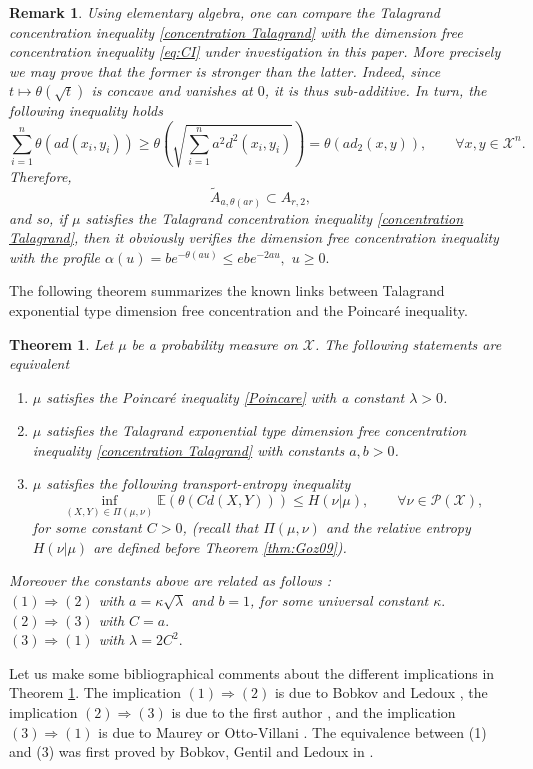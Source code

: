 \documentclass[11pt]{amsart}
\newtheorem{thm}[equation]{Theorem}
\newtheorem{rem}[equation]{Remark}
\numberwithin{equation}{section}
\begin{document}
\begin{rem} \label{froid}
Using elementary algebra, one can compare the Talagrand concentration inequality \eqref{concentration Talagrand}
with the dimension free concentration inequality \eqref{eq:CI} under investigation in this paper.
More precisely we may prove that the former is stronger than the latter.
Indeed, since $t\mapsto \theta(\sqrt{t})$ is concave and vanishes at $0$, it is thus sub-additive. In turn, the following inequality holds
\[
\sum_{i=1}^n\theta(ad(x_i,y_i)) \geq \theta\left(\sqrt{\sum_{i=1}^n a^2d^2(x_i,y_i)}\right)=\theta(ad_2(x,y)),\qquad \forall x,y\in {\mathcal{X}}^n.
\]
Therefore,
\[
\widetilde{A}_{a,\theta(ar)} \subset A_{r,2},
\]
and so, if $\mu$ satisfies the Talagrand concentration inequality \eqref{concentration Talagrand}, then it obviously verifies the dimension free concentration inequality with the profile $\alpha(u)=be^{-\theta(au)}\leq ebe^{-2au},$ $u\geq0.$
\end{rem}

The following theorem summarizes the known links between Talagrand exponential type dimension free concentration and the Poincar\'e inequality.
\begin{thm}\label{Gozlan 09} 
Let $\mu$ be a probability measure on ${\mathcal{X}}$. The following statements are equivalent 
\begin{enumerate}
\item $\mu$ satisfies the Poincar\'e inequality \eqref{Poincare} with a constant $\lambda>0$.
\item $\mu$ satisfies the Talagrand exponential type dimension free concentration inequality \eqref{concentration Talagrand} with constants $a,b>0$.

\item  $\mu$ satisfies the following transport-entropy inequality
\[
\inf_{(X,Y) \in \Pi(\mu,\nu)}\mathbb{E} \left( \theta(Cd(X,Y)) \right) \leq  H(\nu|\mu),\qquad \forall \nu \in \mathcal{P}({\mathcal{X}}),
\]
for some constant $C>0$, (recall that $\Pi(\mu,\nu)$ and the relative entropy $H(\nu|\mu)$ are defined before Theorem \ref{thm:Goz09}).
\end{enumerate}
Moreover the constants above are related as follows :\\
$(1)\Rightarrow (2)$ with $a=\kappa \sqrt{\lambda}$ and $b=1$, for some universal constant $\kappa.$\\
$(2)\Rightarrow (3)$ with $C=a.$\\
$(3)\Rightarrow (1)$ with $\lambda=2C^2.$
\end{thm}
Let us make some bibliographical comments about the different implications in Theorem \ref{Gozlan 09}. The implication $(1)\Rightarrow (2)$ is due to Bobkov and Ledoux \cite{BL97}, the implication $(2)\Rightarrow (3)$ is due to the first author \cite[Theorem 5.1]{Goz09}, and the implication $(3)\Rightarrow (1)$ is due to Maurey \cite{Ma91} or Otto-Villani \cite{OV00}. The equivalence between (1) and (3) was first proved by Bobkov, Gentil and Ledoux in \cite{BGL01}.
\end{document}

